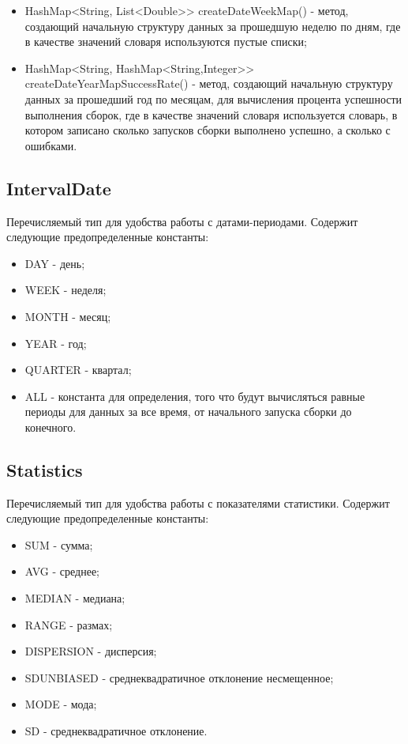 \begin{itemize}
	\item HashMap<String, List<Double>> createDateWeekMap() - метод, создающий начальную структуру данных за прошедшую неделю по дням, где в качестве значений словаря используются пустые списки;
	\item HashMap<String, HashMap<String,Integer>> createDateYearMapSuccessRate() - метод, создающий начальную структуру данных за прошедший год по месяцам, для вычисления процента успешности выполнения сборок, где в качестве значений словаря используется словарь, в котором записано сколько запусков сборки выполнено успешно, а сколько с ошибками.
\end{itemize}
	
	\subsection{IntervalDate}
	
	Перечисляемый тип для удобства работы с датами-периодами. Содержит следующие предопределенные константы:
	
	\begin{itemize}
	\item DAY - день;
	\item WEEK - неделя;
	\item MONTH - месяц;
	\item YEAR - год;
	\item QUARTER - квартал;
	\item ALL - константа для определения, того что будут вычисляться равные периоды для данных за все время, от начального запуска сборки до конечного.
\end{itemize}

	\subsection{Statistics}
	
	Перечисляемый тип для удобства работы с показателями статистики. Содержит следующие предопределенные константы:
	
	\begin{itemize}
	\item SUM - сумма;
	\item AVG - среднее;
	\item MEDIAN - медиана;
	\item RANGE - размах;
	\item DISPERSION - дисперсия;
	\item SDUNBIASED - среднеквадратичное отклонение несмещенное;
	\item MODE - мода;
	\item SD - среднеквадратичное отклонение.
\end{itemize}

